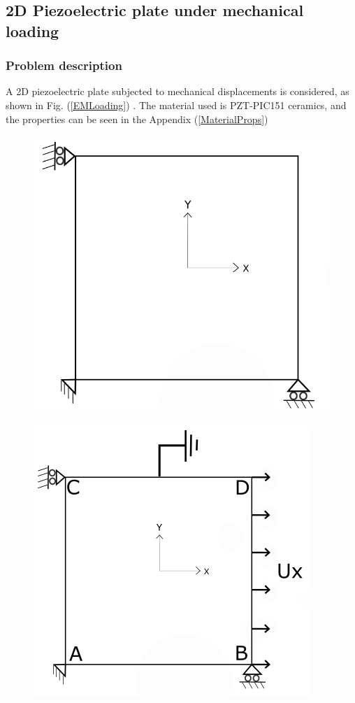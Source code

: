 \documentclass[11pt]{article}
\begin{document}
\subsection{2D Piezoelectric plate under mechanical loading}
\subsubsection{Problem description} \label{2DPPWMLPD}
A 2D piezoelectric plate subjected to mechanical displacements is considered, as shown in Fig. (\ref{EMLoading}) . The material used is PZT-PIC151 ceramics, and the properties can be seen in the Appendix (\ref{MaterialProps})

\begin{figure}[H]
	\centering
	\begin{minipage}{.5\textwidth}
		\centering
		\includegraphics[width=0.8\linewidth]{2DPlate.png}
		\label{2Dplate}
	\end{minipage}%
	\begin{minipage}{.5\textwidth}
		\centering
		\includegraphics[width=1\linewidth]{Grounded.png}

\end{minipage}
\end{figure}
\end{document}
